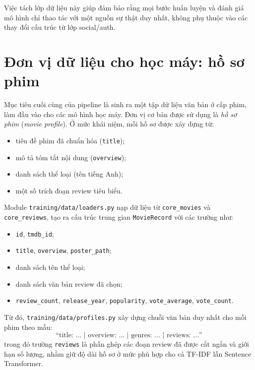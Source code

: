 Việc tách lớp dữ liệu này giúp đảm bảo rằng mọi bước huấn luyện và đánh giá mô hình chỉ thao tác với một nguồn sự thật duy nhất, không phụ thuộc vào các thay đổi cấu trúc từ lớp social/auth.

\section{Đơn vị dữ liệu cho học máy: hồ sơ phim}
Mục tiêu cuối cùng của pipeline là sinh ra một tập dữ liệu văn bản ở cấp phim, làm đầu vào cho các mô hình học máy. Đơn vị cơ bản được sử dụng là \emph{hồ sơ phim} (\textit{movie profile}). Ở mức khái niệm, mỗi hồ sơ được xây dựng từ:
\begin{itemize}
    \item tiêu đề phim đã chuẩn hóa (\texttt{title});
    \item mô tả tóm tắt nội dung (\texttt{overview});
    \item danh sách thể loại (tên tiếng Anh);
    \item một số trích đoạn review tiêu biểu.
\end{itemize}

Module \texttt{training/data/loaders.py} nạp dữ liệu từ \texttt{core\_movies} và \texttt{core\_reviews}, tạo ra cấu trúc trung gian \texttt{MovieRecord} với các trường như:
\begin{itemize}
    \item \texttt{id}, \texttt{tmdb\_id};
    \item \texttt{title}, \texttt{overview}, \texttt{poster\_path};
    \item danh sách tên thể loại;
    \item danh sách văn bản review đã chọn;
    \item \texttt{review\_count}, \texttt{release\_year}, \texttt{popularity}, \texttt{vote\_average}, \texttt{vote\_count}.
\end{itemize}

Từ đó, \texttt{training/data/profiles.py} xây dựng chuỗi văn bản duy nhất cho mỗi phim theo mẫu:
\[
\text{``title: ... | overview: ... | genres: ... | reviews: ...''}
\]
trong đó trường \texttt{reviews} là phần ghép các đoạn review đã được cắt ngắn và giới hạn số lượng, nhằm giữ độ dài hồ sơ ở mức phù hợp cho cả TF-IDF lẫn Sentence Transformer.

